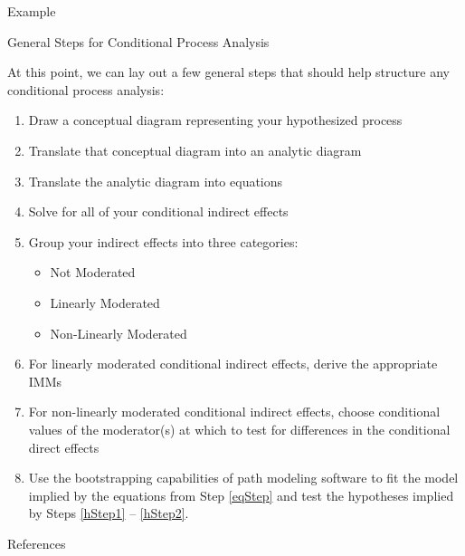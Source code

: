 \documentclass{beamer}
\newcommand{\va}[0]{\vspace{12pt}}
\newcommand{\vb}[0]{\vspace{6pt}}
\begin{document}
\begin{frame}[allowframebreaks]{Example}
  


\pagebreak



\pagebreak



\end{frame}


\begin{frame}[allowframebreaks]{General Steps for Conditional Process Analysis}
  
  At this point, we can lay out a few general steps that should help
  structure any conditional process analysis:
  \va
  \begin{enumerate}
  \item Draw a conceptual diagram representing your hypothesized process
    \vb
  \item Translate that conceptual diagram into an analytic diagram
    \vb
  \item Translate the analytic diagram into equations \label{eqStep}
    \vb
  \item Solve for all of your conditional indirect effects \label{hStep1}
    \vb
  \item Group your indirect effects into three categories:
    \begin{itemize}
    \item Not Moderated
    \item Linearly Moderated
    \item Non-Linearly Moderated
    \end{itemize}
    
    \pagebreak
    
  \item For linearly moderated conditional indirect effects, derive
    the appropriate IMMs
    \vb
  \item For non-linearly moderated conditional indirect effects,
    choose conditional values of the moderator(s) at which to test for
    differences in the conditional direct effects \label{hStep2}
    \vb
  \item Use the bootstrapping capabilities of path modeling software
    to fit the model implied by the equations from Step \ref{eqStep}
    and test the hypotheses implied by Steps \ref{hStep1} --
    \ref{hStep2}.
  \end{enumerate}
  
\end{frame}


\begin{frame}{References}

  
  

\end{frame}
\end{document}
